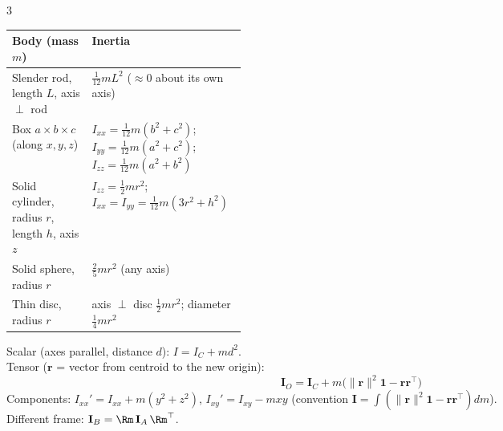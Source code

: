 \begin{multicols}{3}
\begin{tabularx}{\linewidth}{@{}>{\raggedright\arraybackslash}p{0.34\linewidth}>{\raggedright\arraybackslash}X@{}}\toprule
Body (mass $m$) & Inertia\\\midrule
Slender rod, length $L$, axis $\perp$ rod & $\tfrac1{12}mL^2$ ($\approx0$ about its own axis)\\
Box $a\times b\times c$ (along $x,y,z$) & $I_{xx}=\tfrac1{12}m(b^2{+}c^2)$; $I_{yy}=\tfrac1{12}m(a^2{+}c^2)$; $I_{zz}=\tfrac1{12}m(a^2{+}b^2)$\\
Solid cylinder, radius $r$, length $h$, axis $z$ & $I_{zz}=\tfrac12mr^2$; $I_{xx}=I_{yy}=\tfrac1{12}m(3r^2{+}h^2)$\\
Solid sphere, radius $r$ & $\tfrac25mr^2$ (any axis)\\
Thin disc, radius $r$ & axis $\perp$ disc $\tfrac12mr^2$; diameter $\tfrac14mr^2$\\\bottomrule
\end{tabularx}
\begin{fbx}
Scalar (axes parallel, distance $d$): $I=I_C+md^2$.\\
Tensor ($\mathbf r$ = vector from centroid to the new origin):
\[\mathbf I_O=\mathbf I_C+m\big(\|\mathbf r\|^2\mathbf 1-\mathbf r\mathbf r^\top\big)\]
Components: $I_{xx}'=I_{xx}+m(y^2{+}z^2)$, $I_{xy}'=I_{xy}-mxy$ (convention $\mathbf I=\int(\|\mathbf r\|^2\mathbf 1-\mathbf r\mathbf r^\top)dm$).\\
Different frame: $\mathbf I_B=\Rm\,\mathbf I_A\,\Rm^\top$.
\end{fbx}


\end{multicols}
